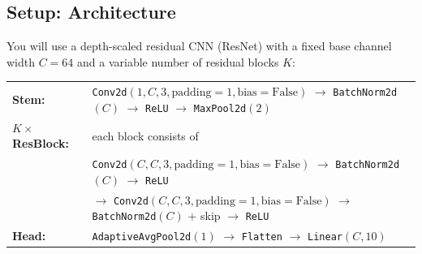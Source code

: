\documentclass[submit]{harvardml}
\begin{document}
\begin{problem}
\subsection*{Setup: Architecture}
You will use a depth-scaled residual CNN (ResNet) with a fixed base channel width $C = 64$ and a variable number of residual blocks $K$:
\begin{center}
\begin{tabular}{@{}l@{\;}l@{}}
\textbf{Stem:} & \texttt{Conv2d}$(1, C, 3, \text{padding}=1, \text{bias}=\text{False})$ $\to$ \texttt{BatchNorm2d}$(C)$ $\to$ \texttt{ReLU} $\to$ \texttt{MaxPool2d}$(2)$ \\[6pt]
\textbf{$K \times$ ResBlock:} & each block consists of \\[2pt]
& \quad \texttt{Conv2d}$(C, C, 3, \text{padding}=1, \text{bias}=\text{False})$ $\to$ \texttt{BatchNorm2d}$(C)$ $\to$ \texttt{ReLU} \\[2pt]
& \quad $\to$ \texttt{Conv2d}$(C, C, 3, \text{padding}=1, \text{bias}=\text{False})$ $\to$ \texttt{BatchNorm2d}$(C)$ + skip $\to$ \texttt{ReLU} \\[6pt]
\textbf{Head:} & \texttt{AdaptiveAvgPool2d}$(1)$ $\to$ \texttt{Flatten} $\to$ \texttt{Linear}$(C, 10)$
\end{tabular}
\end{center}


\end{problem}
\end{document}
